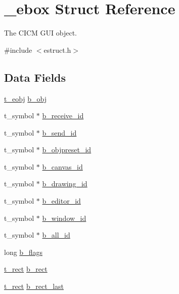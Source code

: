 \hypertarget{struct__ebox}{\section{\-\_\-ebox Struct Reference}
\label{struct__ebox}
}


The C\-I\-C\-M G\-U\-I object.  




{\ttfamily \#include $<$estruct.\-h$>$}

\subsection*{Data Fields}
\begin{DoxyCompactItemize}
\item 
\hyperlink{struct__eobj}{t\-\_\-eobj} \hyperlink{struct__ebox_a384a670299e98768527fbe457de9a38a}{b\-\_\-obj}
\item 
t\-\_\-symbol $\ast$ \hyperlink{struct__ebox_a3fb2b6968877ffd009753ccc0fe96769}{b\-\_\-receive\-\_\-id}
\item 
t\-\_\-symbol $\ast$ \hyperlink{struct__ebox_ac59460230e622f821660b599e2f96ca9}{b\-\_\-send\-\_\-id}
\item 
t\-\_\-symbol $\ast$ \hyperlink{struct__ebox_adc377263d208d1051f4a0997868b1155}{b\-\_\-objpreset\-\_\-id}
\item 
t\-\_\-symbol $\ast$ \hyperlink{struct__ebox_ac0251c6969a1032f8f50d076e909fb3e}{b\-\_\-canvas\-\_\-id}
\item 
t\-\_\-symbol $\ast$ \hyperlink{struct__ebox_a153f9c9929d722ecb29217f3fb0914c9}{b\-\_\-drawing\-\_\-id}
\item 
t\-\_\-symbol $\ast$ \hyperlink{struct__ebox_adf8c80c6ea45ad810c754984d98830ff}{b\-\_\-editor\-\_\-id}
\item 
t\-\_\-symbol $\ast$ \hyperlink{struct__ebox_a7033df943e798c68e3a6117785c2d79e}{b\-\_\-window\-\_\-id}
\item 
t\-\_\-symbol $\ast$ \hyperlink{struct__ebox_a0f63dcf604135dd4fbfbf43eaed53c1a}{b\-\_\-all\-\_\-id}
\item 
long \hyperlink{struct__ebox_abdae234dbd983dfbfb0592858c4ff026}{b\-\_\-flags}
\item 
\hyperlink{struct__rect}{t\-\_\-rect} \hyperlink{struct__ebox_abc70ff46c135ee9f377a038bbc05a33e}{b\-\_\-rect}
\item 
\hyperlink{struct__rect}{t\-\_\-rect} \hyperlink{struct__ebox_a2a0a15d3bc005cd4f815088b230b5ebd}{b\-\_\-rect\-\_\-last}
\item 

\end{DoxyCompactItemize}
